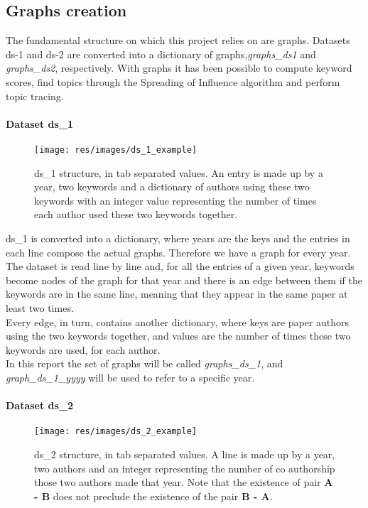 \documentclass{article}
\begin{document}
\subsection{Graphs creation}
The fundamental structure on which this project relies on are graphs.
Datasets ds-1 and ds-2 are converted into a dictionary of graphs,\textit{graphs\_ds1} and \textit{graphs\_ds2}, respectively. With graphs it has been possible to compute keyword scores, find topics through the Spreading of Influence algorithm and perform topic tracing.

\paragraph{Dataset ds\_1}

\begin{figure}[H]
\texttt{[image: res/images/ds\_1\_example]}
\centering
\caption{ds\_1 structure, in tab separated values. An entry is made up by a year, two keywords and a dictionary of authors using these two keywords with an integer value representing the number of times each author used these two keywords together.}
\label{}
\end{figure}

ds\_1 is converted into a dictionary, where years are the keys and the entries in each line compose the actual graphs. Therefore we have a graph for every year.\\
The dataset is read line by line and, for all the entries of a given year, keywords become nodes of the graph for that year and there is an edge between them if the keywords are in the same line, meaning that they appear in the same paper at least two times.\\ 
Every edge, in turn, contains another dictionary, where keys are paper authors using the two keywords together, and values are the number of times these two keywords are used, for each author.\\
In this report the set of graphs will be called \textit{graphs\_ds\_1}, and \textit{graph\_ds\_1\_yyyy} will be used to refer to a specific year.

\paragraph{Dataset ds\_2}

\begin{figure}[H]
\texttt{[image: res/images/ds\_2\_example]}
\centering
\caption{ds\_2 structure, in tab separated values. A line is made up by a year, two authors and an integer representing the number of co authorship those two authors made that year. Note that the existence of pair \textbf{A - B} does not preclude the existence of the pair \textbf{B - A}.}
\label{}
\end{figure}
\end{document}

